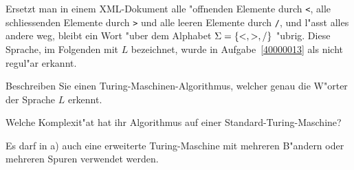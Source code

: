 Ersetzt man in einem XML-Dokument alle "offnenden Elemente durch {\tt <},
alle schliessenden Elemente durch {\tt >} und alle leeren Elemente
durch {\tt /}, und l"asst alles andere weg, bleibt ein Wort "uber
dem Alphabet $\Sigma =\{{\tt <},{\tt >},{\tt /}\}$ "ubrig.
Diese Sprache, im Folgenden mit $L$ bezeichnet, wurde in Aufgabe~\ref{40000013}
als nicht regul"ar erkannt.
\begin{teilaufgaben}
\item
Beschreiben Sie einen Turing-Maschinen-Algorithmus, welcher genau die
W"orter der Sprache $L$ erkennt.
\item
Welche Komplexit"at hat ihr Algorithmus auf einer Standard-Turing-Maschine?
\end{teilaufgaben}

\begin{hinweis}
Es darf in a) auch eine erweiterte Turing-Maschine
mit mehreren B"andern oder mehreren Spuren verwendet werden.
\end{hinweis}

